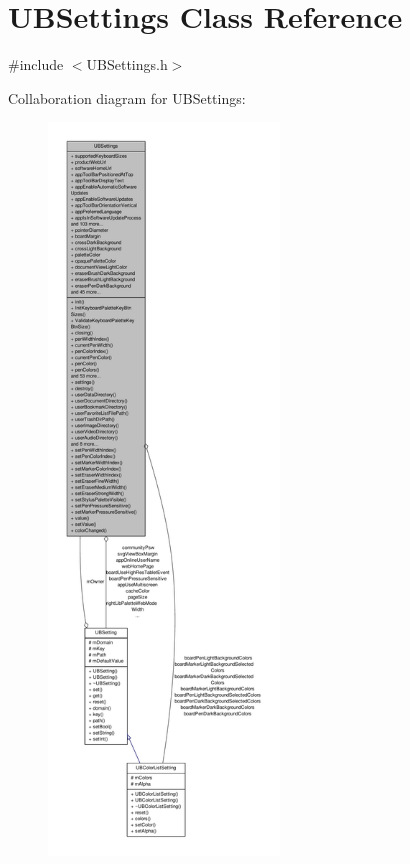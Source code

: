 \hypertarget{class_u_b_settings}{\section{U\-B\-Settings Class Reference}
\label{db/d66/class_u_b_settings}
}


{\ttfamily \#include $<$U\-B\-Settings.\-h$>$}



Collaboration diagram for U\-B\-Settings\-:
\nopagebreak
\begin{figure}[H]
\begin{center}
\leavevmode
\includegraphics[height=550pt]{dd/d27/class_u_b_settings__coll__graph}
\end{center}
\end{figure}
